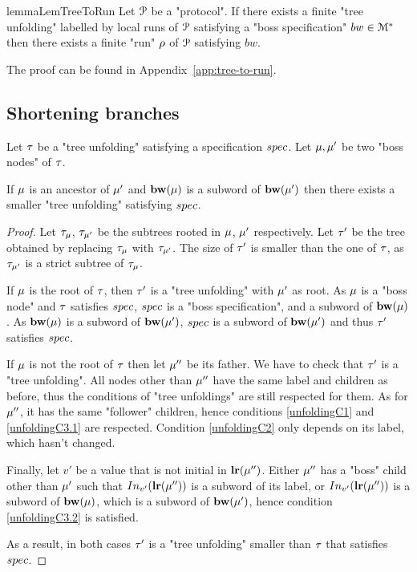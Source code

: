 \begin{restatable}{lemma}{LemTreeToRun}
	\label{lem:tree-to-run}
	Let $\mathcal{P}$ be a "protocol".
	If there exists a finite "tree unfolding" labelled by local runs of $\mathcal{P}$ satisfying a "boss specification" $bw \in \mathcal{M}^*$ then there exists  a finite "run" $\rho$ of $\mathcal{P}$ satisfying $bw$.
\end{restatable}

The proof can be found in Appendix~\ref{app:tree-to-run}.



\subsection{Shortening branches}
\label{sec:decidability-shortening-branches}

\begin{lemma}
	\label{lem:increasing-bosses}
	Let $\tau$ be a "tree unfolding" satisfying a specification $\spec$.
	Let $\mu, \mu'$ be two "boss nodes" of $\tau$.
	
	If $\mu$ is an ancestor of $\mu'$ and $\mathbf{bw}(\mu)$ is a subword of $\mathbf{bw}(\mu')$ then there exists a smaller "tree unfolding" satisfying $\spec$.  
\end{lemma}

\ifproofs
\begin{proof}
	Let $\tau_{\mu}$, $\tau_{\mu'}$ be the subtrees rooted in $\mu$, $\mu'$ respectively. 
	Let $\tau'$ be the tree obtained by replacing $\tau_{\mu}$ with $\tau_{\mu'}$. The size of $\tau'$ is smaller than the one of $\tau$, as $\tau_{\mu'}$ is a strict subtree of $\tau_{\mu}$.
	
	If $\mu$ is the root of $\tau$, then $\tau'$ is a "tree unfolding" with $\mu'$ as root. As $\mu$ is a "boss node" and $\tau$ satisfies $\spec$, $\spec$ is a "boss specification", and a subword of $\mathbf{bw}(\mu)$.
	As $\mathbf{bw}(\mu)$ is a subword of $\mathbf{bw}(\mu')$, $\spec$ is a subword of $\mathbf{bw}(\mu')$ and thus $\tau'$ satisfies $\spec$.
	
	If $\mu$ is not the root of $\tau$ then let $\mu''$ be its father. We have to check that $\tau'$ is a "tree unfolding". 
	All nodes other than $\mu''$ have the same label and children as before, thus the conditions of "tree unfoldings" are still respected for them.
	As for $\mu''$, it has the same "follower" children, hence conditions \ref{unfoldingC1} and \ref{unfoldingC3.1} are respected. Condition \ref{unfoldingC2} only depends on its label, which hasn't changed.
	
	Finally, let $v'$ be a value that is not initial in $\mathbf{lr}(\mu'')$. Either $\mu''$ has a "boss" child other than $\mu'$ such that $\vinput{v'}{\localrunlabel{\node''}}$ is a subword of its label, or $\vinput{v'}{\localrunlabel{\node''}}$ is a subword of $\mathbf{bw}(\mu)$, which is a subword of $\mathbf{bw}(\mu')$, hence condition \ref{unfoldingC3.2} is satisfied. 
	
	As a result, in both cases $\tau'$ is a "tree unfolding" smaller than $\tau$ that satisfies $\spec$. 
\end{proof}
\fi

